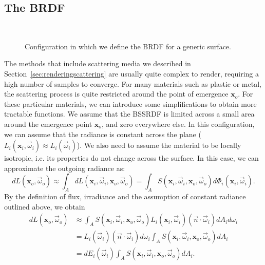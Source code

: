 \subsection{The BRDF}
\begin{figure}
\centering
   \def\svgwidth{0.8\textwidth}
    \\
\caption{Configuration in which we define the BRDF for a generic surface.} %
\label{fig:brdf_configuration}
\end{figure}

The methods that include scattering media we described in Section~\ref{sec:renderingscattering} are usually quite complex to render, requiring a high number of samples to converge. For many materials such as plastic or metal, the scattering process  is quite restricted around the point of emergence $\mathbf{x}_o$. For these particular materials, we can introduce some simplifications to obtain more tractable functions. We assume that the BSSRDF is limited across a small area around the emergence point $\mathbf{x}_o$, and zero everywhere else. In this configuration, we can assume that the radiance is constant across the plane ($L_i(\mathbf{x}_i, \vec{\omega}_i) \approx L_i(\vec{\omega}_i)$). We also need to assume the material to be locally isotropic, i.e. its properties do not change across the surface. In this case, we can approximate the outgoing radiance as:
\begin{equation*}
d L(\mathbf{x}_o, \vec{\omega}_o) \approx \int_A d L(\mathbf{x}_i, \vec{\omega}_i, \mathbf{x}_o, \vec{\omega}_o) = \int_A S(\mathbf{x}_i, \vec{\omega}_i, \mathbf{x}_o, \vec{\omega}_o) d \Phi_i(\mathbf{x}_i, \vec{\omega}_i).
\end{equation*}
By the definition of flux, irradiance and the assumption of constant radiance outlined above, we obtain 
\begin{equation*}
\begin{split}
d L(\mathbf{x}_o, \vec{\omega}_o) &\approx \int_A S(\mathbf{x}_i, \vec{\omega}_i, \mathbf{x}_o, \vec{\omega}_o) L_i(\mathbf{x}_i, \vec{\omega}_i) (\vec{n} \cdot \vec{\omega}_i) d A_i d \omega_i  \\ &= L_i(\vec{\omega}_i) (\vec{n} \cdot \vec{\omega}_i) d \omega_i \int_A S(\mathbf{x}_i, \vec{\omega}_i, \mathbf{x}_o, \vec{\omega}_o)   d A_i \\ &= d E_i(\vec{\omega}_i) \int_A S(\mathbf{x}_i, \vec{\omega}_i, \mathbf{x}_o, \vec{\omega}_o) d A_i.
\end{split}
\end{equation*}

